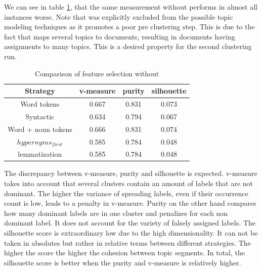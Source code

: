 We can see in table \ref{comparison_single_without_lsa}, that the same measurement without \lsa{} performs in almost all instances worse. Note that \lda{} was explicitly excluded from the possible topic modeling techniques as it promotes a poor pre clustering step. This is due to the fact that \lda{} maps several topics to documents, resulting in documents having assignments to many topics. This is a desired property for the second clustering run.

  \begin{table}[h!]\label{comparison_single_without_lsa}
    \begin{tabular}{ c | c | c | c }
      Strategy    & v-measure & purity  & silhouette \\ \hline
      Word tokens & 0.667     & 0.831   & 0.073      \\
      Syntactic   & 0.634     & 0.794     & 0.067 \\
      Word + noun tokens & 0.666   & 0.831     & 0.074 \\
      \wordnet{} $hypernyms_{first}$ & 0.585   & 0.784     & 0.048 \\
      \wordnet{} lemmatization   & 0.585   & 0.784     & 0.048 \\
    \end{tabular}
    \caption{Comparison of feature selection without \lsa{}}
  \end{table}

The discrepancy between v-measure, purity and silhouette is expected. v-measure takes into account that several clusters contain an amount of labels that are not dominant. The higher the variance of spreading labels, even if their occurrence count is low, leads to a penalty in v-measure. Purity on the other hand compares how many dominant labels are in one cluster and penalizes for each non dominant label. It does not account for the variety of falsely assigned labels. The silhouette score is extraordinary low due to the high dimensionality. It can not be taken in absolutes but rather in relative terms between different strategies. The higher the score the higher the cohesion between topic segments. In total, the silhouette score is better when the purity and v-measure is relatively higher.


